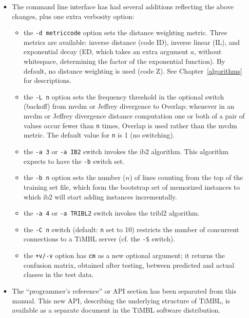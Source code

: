 \documentclass{book}
\begin{document}
\begin{itemize}
\item The command line interface has had several additions reflecting
the above changes, plus one extra verbosity option:

\begin{itemize}
	\item the {\tt -d metriccode} option sets the distance
          weighting metric. Three metrics are available: inverse
          distance (code ID), inverse linear (IL), and exponential
          decay (ED, which takes an extra argument $a$, without
          whitespace, determining the factor of the exponential
          function). By default, no distance weighting is used (code
          Z). See Chapter~\ref{algorithms} for descriptions.
        \item the {\tt -L n} option sets the frequency threshold in
          the optional switch (backoff) from {\sc mvdm} or Jeffrey
          divergence to Overlap; whenever in an {\sc mvdm} or Jeffrey
          divergence distance computation one or both of a pair of
          values occur fewer than {\tt n} times, Overlap is used
          rather than the {\sc mvdm} metric.  The default value for
          {\tt n} is 1 (no switching).
	\item the {\tt -a 3} or {\tt -a IB2} switch invokes the
              {\sc ib2} algorithm. This algorithm expects to have
              the {\tt -b} switch set.
	\item the {\tt -b n} option sets the number ($n$) of lines
              counting from the top of the training set file, which form
              the bootstrap set of memorized instances to which {\sc ib2}
              will start adding instances incrementally.
	\item the {\tt -a 4} or {\tt -a TRIBL2} switch invokes the
              {\sc tribl2} algorithm.
        \item the {\tt -C n} switch (default: {\tt n} set to 10) restricts
              the number of concurrent connections to a TiMBL server
              (cf. the {\tt -S} switch).
	\item the {\tt +v/-v} option has {\tt cm} as a new optional
              argument; it returns the confusion matrix, obtained
              after testing, between predicted and actual classes in
              the test data.
\end{itemize}

\item The ``programmer's reference'' or API section has been separated
  from this manual. This new API, describing the underlying structure
  of TiMBL, is available as a separate document in the TiMBL software
  distribution.


\end{itemize}
\end{document}
